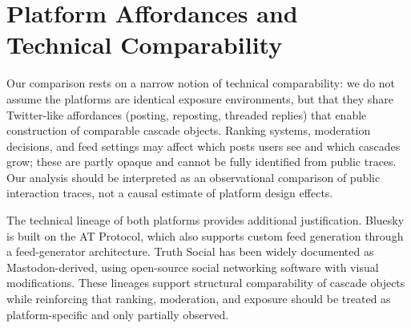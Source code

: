 \documentclass[letterpaper]{article} %
\begin{document}
\section{Platform Affordances and Technical Comparability}
\label{app:platform_affordances}

Our comparison rests on a narrow notion of technical comparability: we do not assume the platforms are identical exposure environments, but that they share Twitter-like affordances (posting, reposting, threaded replies) that enable construction of comparable cascade objects. Ranking systems, moderation decisions, and feed settings may affect which posts users see and which cascades grow; these are partly opaque and cannot be fully identified from public traces. Our analysis should be interpreted as an observational comparison of public interaction traces, not a causal estimate of platform design effects.

The technical lineage of both platforms provides additional justification. Bluesky is built on the AT Protocol, which also supports custom feed generation through a feed-generator architecture. Truth Social has been widely documented as Mastodon-derived, using open-source social networking software with visual modifications. These lineages support structural comparability of cascade objects while reinforcing that ranking, moderation, and exposure should be treated as platform-specific and only partially observed.
\end{document}
